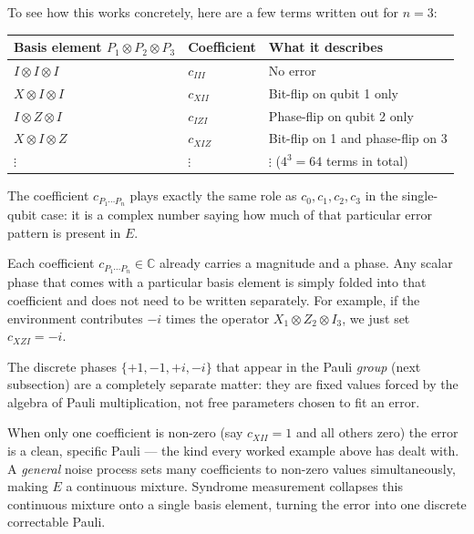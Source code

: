 \documentclass[11pt, a4paper]{article}
\theoremstyle{definition}
\theoremstyle{plain}
\theoremstyle{remark}
\begin{document}
\medskip
To see how this works concretely, here are a few terms written out for
$n = 3$:

\begin{center}
\renewcommand{\arraystretch}{1.3}
\begin{tabular}{@{} l l l @{}}
  \toprule
  \textbf{Basis element} $P_1\otimes P_2\otimes P_3$
    & \textbf{Coefficient}
    & \textbf{What it describes}\\
  \midrule
  $I \otimes I \otimes I$ & $c_{III}$ & No error\\
  $X \otimes I \otimes I$ & $c_{XII}$ & Bit-flip on qubit 1 only\\
  $I \otimes Z \otimes I$ & $c_{IZI}$ & Phase-flip on qubit 2 only\\
  $X \otimes I \otimes Z$ & $c_{XIZ}$ & Bit-flip on 1 and phase-flip on 3\\
  $\vdots$ & $\vdots$ & $\vdots$ ($4^3 = 64$ terms in total)\\
  \bottomrule
\end{tabular}
\end{center}

The coefficient $c_{P_1\cdots P_n}$ plays exactly the same role as
$c_0, c_1, c_2, c_3$ in the single-qubit case: it is a complex number
saying how much of that particular error pattern is present in $E$.

\begin{keypoint}
Each coefficient $c_{P_1\cdots P_n} \in \mathbb{C}$ already carries a
magnitude and a phase.  Any scalar phase that comes with a particular
basis element is simply folded into that coefficient and does not need
to be written separately.  For example, if the environment contributes
$-i$ times the operator $X_1 \otimes Z_2 \otimes I_3$, we just set
$c_{XZI} = -i$.

The discrete phases $\{+1,-1,+i,-i\}$ that appear in the Pauli
\emph{group} (next subsection) are a completely separate matter: they
are fixed values forced by the algebra of Pauli multiplication, not
free parameters chosen to fit an error.
\end{keypoint}

When only one coefficient is non-zero (say $c_{XII} = 1$ and all others
zero) the error is a clean, specific Pauli --- the kind every worked
example above has dealt with.
A \emph{general} noise process sets many coefficients to non-zero
values simultaneously, making $E$ a continuous mixture.
Syndrome measurement collapses this continuous mixture onto a single
basis element, turning the error into one discrete correctable Pauli.
\end{document}
